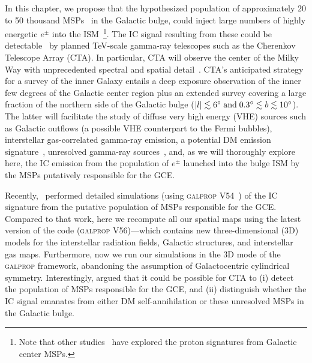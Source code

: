 \documentclass[doublespace,nopageskip]{VTthesis} %
\begin{document}
In this chapter, we propose that the hypothesized population of approximately 20 to 50 thousand MSPs~\citep{2020JCAP...12..035P} in the Galactic bulge, could inject large numbers of highly energetic $e^{\pm}$ into the ISM~\footnote{Note that other studies~\citep[e.g.,][]{2018JCAP...07..042G} have explored the proton signatures from Galactic center MSPs.}. The  IC signal resulting from these could be detectable~\citep{2019PhRvD..99l3020S} by planned TeV-scale gamma-ray telescopes such as 
the Cherenkov Telescope Array (CTA). 
%
In particular, CTA will observe the center of the Milky Way with unprecedented spectral and spatial detail~\citep{2019scta.book.....C}. 
%
CTA's anticipated strategy for a survey of the inner Galaxy entails a deep exposure observation of the inner few degrees of the Galactic center region plus an extended survey covering a large fraction of the northern side of the Galactic bulge ($|l|\lesssim 6^{\circ}\;{\rm and}\; 0.3^{\circ}\lesssim b \lesssim 10^{\circ}$). The latter will facilitate the study of diffuse very high energy (VHE) sources such as Galactic outflows (a possible VHE counterpart to the Fermi bubbles), interstellar gas-correlated gamma-ray emission, a potential DM emission signature~\citep{2021JCAP...01..057A}, unresolved gamma-ray sources~\citep{2019ICRC...36..817V}, and, as we will thoroughly explore here, the IC emission from the 
population of $e^\pm$ launched into the bulge ISM by the
 MSPs putatively responsible for the GCE.  



Recently,~\citet{2019PhRvD..99l3020S} performed detailed simulations (using \textsc{galprop} V54~\citealt{2006ApJ...648L..29P}) of the IC signature from the putative population of MSPs responsible for the GCE. Compared to that work, here we recompute all our spatial maps using the latest version of the code (\textsc{galprop} V56)---which contains new three-dimensional (3D) models for the interstellar radiation fields, Galactic structures, and interstellar gas maps. Furthermore, now we run our simulations in the 3D mode of the \textsc{galprop} framework, abandoning the assumption of Galactocentric cylindrical symmetry. Interestingly, \cite{2019PhRvD..99l3020S} argued that it could be possible for CTA to (i) detect the population of MSPs responsible for the GCE, and (ii) distinguish whether the IC signal emanates from either DM self-annihilation or these unresolved MSPs in the Galactic bulge. 
\end{document}
